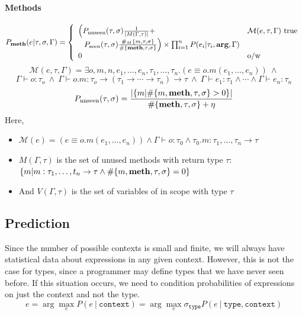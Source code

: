 \documentclass{article} %
\begin{document}
\paragraph{Methods}
$$P_{\textbf{meth}}(e | \tau, \sigma, \Gamma) = 
\left\{
	\begin{array}{ll}
          \left(P_{\text{unseen}}(\tau, \sigma)\frac{1}{|M(\Gamma, \tau)|} + \right. & \mathcal{M}(e, \tau, \Gamma)\mbox{ true} \\
	 \left. ~~P_{\text{seen}}(\tau, \sigma)\frac{\#_M\{m, \tau, \sigma\}}{\#\{\textbf{meth}, \tau, \sigma\}}\right) \times \prod_{i=1}^n P(e_i | \tau_i, \textbf{arg}, \Gamma) & \\
	0 & \mbox{o/w}
	\end{array}
\right.$$
$$\mathcal{M}(e, \tau, \Gamma) = \exists o, m, n, e_1, \ldots, e_n, \tau_1, \ldots, \tau_n. (e \equiv o.m(e_1, \ldots, e_n))~\land$$
$$
\Gamma \vdash o : \tau_o~\land~\Gamma \vdash o.m : \tau_o \rightarrow (\tau_1 \rightarrow \cdots \rightarrow \tau_n) \rightarrow \tau~\land~\Gamma \vdash e_1 : \tau_1 \land \cdots \land \Gamma \vdash e_n : \tau_n$$
$$P_{\text{unseen}}(\tau, \sigma) = \frac{ |\{m | \#\{m, \textbf{meth}, \tau, \sigma\} > 0\}|}{\#\{\textbf{meth}, \tau, \sigma\} + \eta}$$
Here, 
  \begin{itemize}
    \item $\mathcal{M}(e) = (e \equiv o.m(e_1, \ldots, e_n))  \land \Gamma \vdash o : \tau_0 \land \tau_0.m : \tau_1, \ldots, \tau_n \to \tau$
    \item $M(\Gamma, \tau)$ is the set of unused methods with return type $\tau$: \\ $\{m | m : \tau_1, \ldots, t_n \to \tau \land \#\{m, \textbf{meth}, \tau, \sigma\} = 0\}$
    \item And $V(\Gamma, \tau)$ is the set of variables of  in scope with type $\tau$
  \end{itemize}

\subsection*{Prediction}

Since the number of possible contexts is small and finite, we will always have statistical data about expressions in any given context. However, this is not the case for types, since a programmer may define types that we have never seen before. If this situation occurs, we need to condition probabilities of expressions on just the context and not the type. 
$$ e = \arg\max_e P(e ~|~ \texttt{context} ) = \arg\max_e \sigma_{\texttt{type}} P(e ~|~ \texttt{type} , \texttt{context} ) $$
\end{document}

